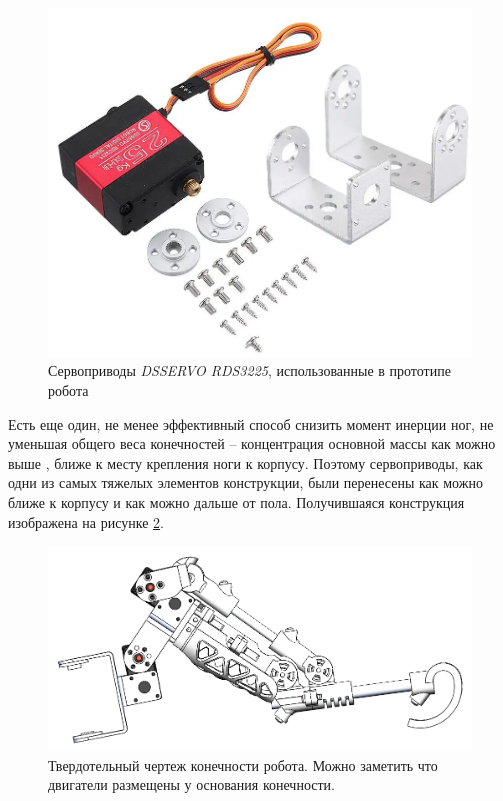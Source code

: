 \begin{figure}[h]
    \centering
    \includegraphics[scale=0.45]{chapter_mechanics_construction/figure6.png}
    \caption{Сервоприводы \textit{DSSERVO RDS3225}, использованные в прототипе робота}
    \label{}
\end{figure}

Есть еще один, не менее эффективный способ снизить момент инерции ног, не уменьшая общего веса конечностей -- концентрация основной массы как можно выше \cite{Seok2012}, ближе к месту крепления ноги к корпусу. Поэтому сервоприводы, как одни из самых тяжелых элементов конструкции, были перенесены как можно ближе к корпусу и как можно дальше от пола. Получившаяся конструкция изображена на рисунке \ref{fig:figg7}.

\begin{figure}[h]
    \centering
    \includegraphics[scale=0.7]{chapter_mechanics_construction/figure7.png}
    \caption{Твердотельный чертеж конечности робота. Можно заметить что двигатели размещены у основания конечности.}
    \label{fig:figg7}
\end{figure}

